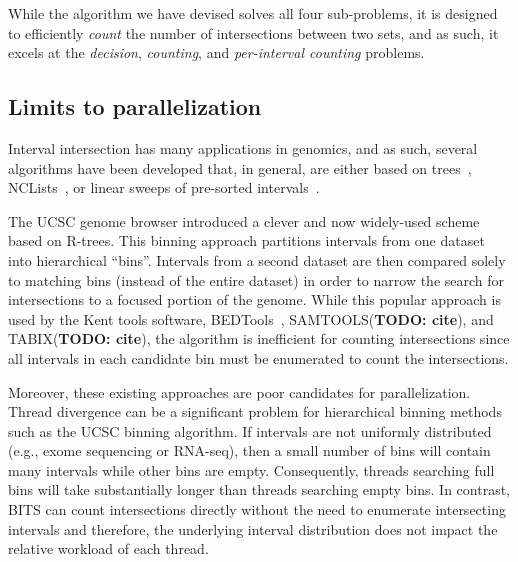 \documentclass{bioinfo}
\begin{document}
	While the algorithm we have devised solves all four sub-problems, it is
	designed to efficiently \emph{count} the number of intersections between
	two sets, and as such, it excels at the \emph{decision}, \emph{counting},
	and \emph{per-interval counting} problems.


	\subsection{Limits to parallelization}

	Interval intersection has many applications in genomics, and 
	as such, several algorithms have been developed that, in general,
	are either based on trees~\citep{kent2002}, 
	NCLists~\citep{alekseyenko2007}, or linear sweeps of 
	pre-sorted intervals~\citep{richardson2006}.
	
	The UCSC genome browser introduced a clever and now widely-used 
	scheme based on R-trees. This binning approach partitions intervals 
	from one dataset into hierarchical ``bins''.  Intervals from a second 
	dataset are then compared solely to matching bins (instead of the 
	entire dataset) in order to narrow the search for intersections to 
	a focused portion of the genome.  While this popular approach is 
	used by the Kent tools software, BEDTools~\citep{quinlan2010}, 
	SAMTOOLS(\textbf{TODO: cite}), and TABIX(\textbf{TODO: cite}), the 
	algorithm is inefficient for counting intersections since all intervals
	in each candidate bin must be enumerated to count the intersections.
	
	Moreover, these existing approaches are poor candidates for
	parallelization.  Thread divergence can be a significant problem for
	hierarchical binning methods such as the UCSC binning algorithm.  
	If intervals are not uniformly distributed (e.g., exome sequencing 
	or RNA-seq), then a small number of bins will contain many intervals
	while other bins are empty. Consequently, threads searching full bins
	will take substantially longer than threads searching empty bins.  In
	contrast, BITS can count intersections directly without the need 
	to enumerate intersecting intervals and therefore, the underlying
	interval distribution does not impact the relative workload of each thread.
\end{document}

